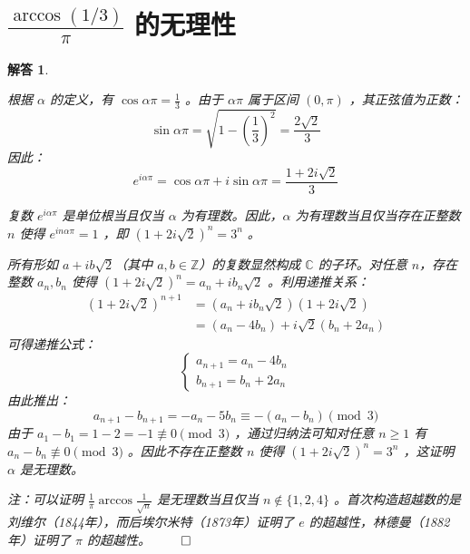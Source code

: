 \documentclass[12pt,UTF8]{ctexbook}
\theoremstyle{exercisestyle}
\theoremstyle{solutionstyle}
\newtheorem*{solution*}{解答}
\newenvironment{solution}
  {\begin{solution*}}
  {\hfill\ensuremath{\qed}\end{solution*}}
\begin{document}
\section{$\frac{\arccos (1/3)}{\pi}$ 的无理性}
\begin{solution}
\begin{subquestions}
\item 根据 $\alpha$ 的定义，有 $\cos \alpha \pi = \frac{1}{3}$ 。由于 $\alpha \pi$ 属于区间 $(0, \pi)$ ，其正弦值为正数：
$$
\sin \alpha \pi = \sqrt{1 - \left(\frac{1}{3}\right)^2} = \frac{2\sqrt{2}}{3}
$$
因此：
$$
e^{i\alpha\pi} = \cos \alpha \pi + i\sin \alpha \pi = \frac{1+2i\sqrt{2}}{3}
$$

\item 复数 $e^{i\alpha\pi}$ 是单位根当且仅当 $\alpha$ 为有理数。因此，$\alpha$ 为有理数当且仅当存在正整数 $n$ 使得 $e^{in\alpha\pi} = 1$ ，即 $(1+2i\sqrt{2})^n = 3^n$ 。

\item 所有形如 $a+ib\sqrt{2}$（其中 $a,b \in \mathbb{Z}$）的复数显然构成 $\mathbb{C}$ 的子环。对任意 $n$，存在整数 $a_n,b_n$ 使得 $(1+2i\sqrt{2})^n = a_n + ib_n\sqrt{2}$ 。利用递推关系：
$$
\begin{aligned}
(1+2i\sqrt{2})^{n+1} &= (a_n+ib_n\sqrt{2})(1+2i\sqrt{2}) \\
&= (a_n - 4b_n) + i\sqrt{2}(b_n + 2a_n)
\end{aligned}
$$
可得递推公式：
$$
\begin{cases}
a_{n+1} = a_n - 4b_n \\
b_{n+1} = b_n + 2a_n
\end{cases}
$$
由此推出：
$$
a_{n+1} - b_{n+1} = -a_n - 5b_n \equiv -(a_n - b_n) \pmod{3}
$$
由于 $a_1 - b_1 = 1 - 2 = -1 \not\equiv 0 \pmod{3}$ ，通过归纳法可知对任意 $n \geq 1$ 有 $a_n - b_n \not\equiv 0 \pmod{3}$ 。因此不存在正整数 $n$ 使得 $(1 + 2i\sqrt{2})^n = 3^n$ ，这证明 $\alpha$ 是无理数。
\end{subquestions}

注：可以证明 $\frac{1}{\pi}\arccos \frac{1}{\sqrt{n}}$ 是无理数当且仅当 $n \notin \{1, 2, 4\}$ 。首次构造超越数的是刘维尔（1844年），而后埃尔米特（1873年）证明了 $e$ 的超越性，林德曼（1882年）证明了 $\pi$ 的超越性。
\end{solution}
\end{document}
